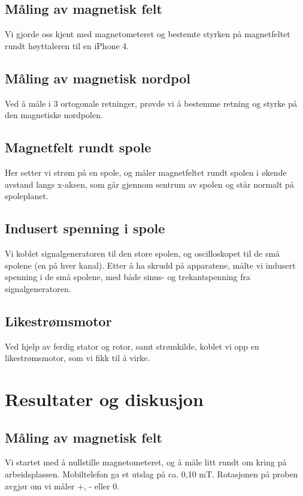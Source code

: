 \documentclass[12pt,norsk,a4paper]{article}
\begin{document}
\subsection{Måling av magnetisk felt}
Vi gjorde oss kjent med magnetometeret og bestemte styrken på magnetfeltet rundt høyttaleren til en iPhone 4.

\subsection{Måling av magnetisk nordpol}
Ved å måle i 3 ortogonale retninger, prøvde vi å bestemme retning og styrke på den magnetiske nordpolen.


\subsection{Magnetfelt rundt spole}
Her setter vi strøm på en spole, og måler magnetfeltet rundt spolen i økende avstand langs x-aksen, som går gjennom sentrum av spolen og står normalt på spoleplanet.


\subsection{Indusert spenning i spole}
Vi koblet signalgeneratoren til den store spolen, og oscilloskopet til de små spolene (en på hver kanal). Etter å ha skrudd på apparatene, målte vi indusert spenning i de små spolene, med både sinus- og trekantspenning fra signalgeneratoren.

\subsection{Likestrømsmotor}
Ved hjelp av ferdig stator og rotor, samt strømkilde, koblet vi opp en likestrømsmotor, som vi fikk til å virke.
\clearpage



\section{Resultater og diskusjon}
\subsection{Måling av magnetisk felt}
Vi startet med å nullstille magnetometeret, og å måle litt rundt om kring på arbeidsplassen. Mobiltelefon ga et utslag på ca. 0,10 mT. Rotasjonen på proben avgjør om vi måler +, - eller 0.
\end{document}
